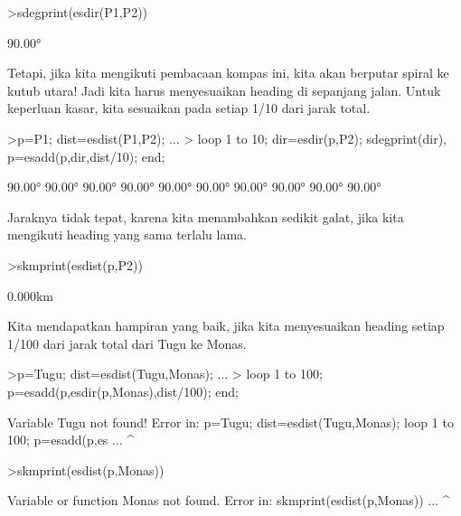 \documentclass[a4paper,10pt]{article}
\begin{document}
\begin{eulernotebook}
\begin{eulercomment}
\begin{eulercomment}
\begin{eulercomment}
\begin{eulercomment}
\begin{eulercomment}
\begin{eulercomment}
\begin{eulercomment}
\begin{eulercomment}
\begin{eulercomment}
\begin{eulercomment}
\begin{eulercomment}
\begin{eulercomment}
\begin{eulercomment}
\begin{eulercomment}
\begin{eulercomment}
\begin{eulercomment}
\begin{eulercomment}
\begin{eulercomment}
\begin{eulerprompt}
>sdegprint(esdir(P1,P2))
\end{eulerprompt}
\begin{euleroutput}
       90.00°
\end{euleroutput}
\begin{eulercomment}
Tetapi, jika kita mengikuti pembacaan kompas ini, kita akan berputar spiral ke kutub utara!
Jadi kita harus menyesuaikan heading di sepanjang jalan. Untuk keperluan kasar, kita sesuaikan
pada setiap 1/10 dari jarak total.
\end{eulercomment}
\begin{eulerprompt}
>p=P1;  dist=esdist(P1,P2); ...
>  loop 1 to 10; dir=esdir(p,P2); sdegprint(dir), p=esadd(p,dir,dist/10); end;
\end{eulerprompt}
\begin{euleroutput}
       90.00°
       90.00°
       90.00°
       90.00°
       90.00°
       90.00°
       90.00°
       90.00°
       90.00°
       90.00°
\end{euleroutput}
\begin{eulercomment}
Jaraknya tidak tepat, karena kita menambahkan sedikit galat, jika kita mengikuti heading yang
sama terlalu lama.
\end{eulercomment}
\begin{eulerprompt}
>skmprint(esdist(p,P2))
\end{eulerprompt}
\begin{euleroutput}
       0.000km
\end{euleroutput}
\begin{eulercomment}
Kita mendapatkan hampiran yang baik, jika kita menyesuaikan heading setiap 1/100 dari jarak
total dari Tugu ke Monas.
\end{eulercomment}
\begin{eulerprompt}
>p=Tugu; dist=esdist(Tugu,Monas); ...
>  loop 1 to 100; p=esadd(p,esdir(p,Monas),dist/100); end;
\end{eulerprompt}
\begin{euleroutput}
  Variable Tugu not found!
  Error in:
  p=Tugu; dist=esdist(Tugu,Monas);   loop 1 to 100; p=esadd(p,es ...
        ^
\end{euleroutput}
\begin{eulerprompt}
>skmprint(esdist(p,Monas))
\end{eulerprompt}
\begin{euleroutput}
  Variable or function Monas not found.
  Error in:
  skmprint(esdist(p,Monas)) ...
                         ^

\end{euleroutput}
\end{eulercomment}
\end{eulercomment}
\end{eulercomment}
\end{eulercomment}
\end{eulercomment}
\end{eulercomment}
\end{eulercomment}
\end{eulercomment}
\end{eulercomment}
\end{eulercomment}
\end{eulercomment}
\end{eulercomment}
\end{eulercomment}
\end{eulercomment}
\end{eulercomment}
\end{eulercomment}
\end{eulercomment}
\end{eulercomment}
\end{eulernotebook}
\end{document}
